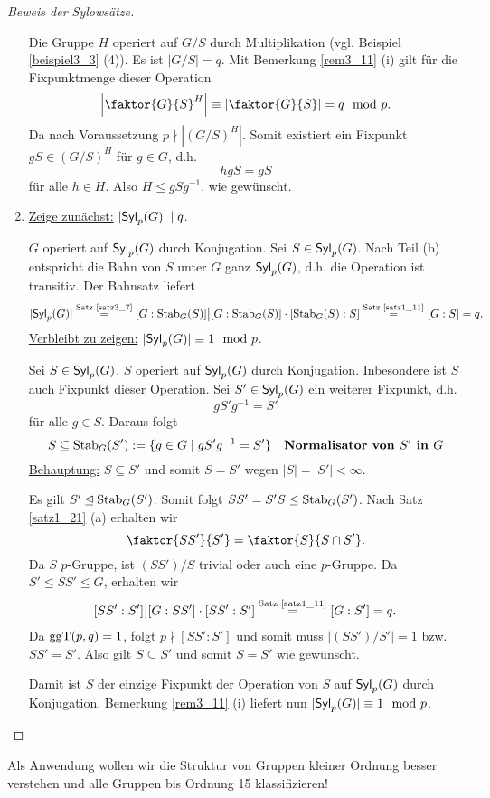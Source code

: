 \begin{proof}[Beweis der Sylowsätze]
\begin{enumerate}[label=(\alph*)]
		Die Gruppe $H$ operiert auf $G/S$ durch Multiplikation (vgl. Beispiel \ref{beispiel3_3} (4)). Es ist $|G/S| = q$. Mit Bemerkung \ref{rem3_11} (i) gilt für die Fixpunktmenge dieser Operation
		\[\left|{\faktor{G}{S}}^H\right| \equiv \left|\faktor{G}{S}\right| = q \mod p.\]
		Da nach Voraussetzung $p \nmid |(G/S)^H|$. Somit existiert ein Fixpunkt $gS \in (G/S)^H$ für $g \in G$, d.h. 
		\[hgS = gS\]
		für alle $h \in H$. Also $H \leq gSg^{-1}$, wie gewünscht.
		
		\item \underline{Zeige zunächst:} $|\mathsf{Syl}_p(G)| \mid q$.
		
		$G$ operiert auf $\mathsf{Syl}_p(G)$ durch Konjugation. Sei $S \in \mathsf{Syl}_p(G)$. Nach Teil (b) entspricht die Bahn von $S$ unter $G$ ganz $\mathsf{Syl}_p(G)$, d.h. die Operation ist transitiv. Der Bahnsatz liefert
		\[|\mathsf{Syl}_p(G)| \overset{\text{Satz \ref{satz3_7}}}{=} [G:\mathrm{Stab}_G(S)] \big| [G:\mathrm{Stab}_G(S)] \cdot [\mathrm{Stab}_G(S) : S] \overset{\text{Satz \ref{satz1_11}}}{=} [G:S] = q.\]
		\underline{Verbleibt zu zeigen:} $|\mathsf{Syl}_p(G)| \equiv 1 \mod p$.

		Sei $S \in \mathsf{Syl}_p(G)$. $S$ operiert auf $\mathsf{Syl}_p(G)$ durch Konjugation. Inbesondere ist $S$ auch Fixpunkt dieser Operation. Sei $S' \in \mathsf{Syl}_p(G)$ ein weiterer Fixpunkt, d.h. 
		\[gS'g^{-1} = S'\]
		für alle $g \in S$. Daraus folgt
		\[S \subseteq \mathrm{Stab}_G(S') := \{g \in G\mid gS'g^{-1} = S'\} \quad \textbf{Normalisator von $S'$ in $G$}\]
		\underline{Behauptung:} $S \subseteq S'$ und somit $S = S'$ wegen $|S| = |S'| < \infty$.
		
		Es gilt $S' \unlhd \mathrm{Stab}_G(S')$. Somit folgt $SS' = S'S \leq \mathrm{Stab}_G(S')$. Nach Satz \ref{satz1_21} (a) erhalten wir 
		\[\faktor{SS'}{S'} = \faktor{S}{S \cap S'}.\]
		Da $S$ $p$-Gruppe, ist $(SS')/S$ trivial oder auch eine $p$-Gruppe. Da $S' \leq SS' \leq G$, erhalten wir
		\[[SS' : S'] \big| [G : SS'] \cdot [SS' : S'] \overset{\text{Satz \ref{satz1_11}}}{=} [G:S'] = q.\]
		Da $\mathrm{ggT}(p,q) = 1$, folgt $p \nmid [SS' : S']$ und somit muss $|(SS')/S'| = 1$ bzw. $SS' = S'$. Also gilt $S \subseteq S'$ und somit $S = S'$ wie gewünscht.
		
		Damit ist $S$ der einzige Fixpunkt der Operation von $S$ auf $\mathsf{Syl}_p(G)$ durch Konjugation. Bemerkung \ref{rem3_11} (i) liefert nun $|\mathsf{Syl}_p(G)| \equiv 1 \mod p$.
	\end{enumerate}
\end{proof}

\begin{leftbar}
	Als Anwendung wollen wir die Struktur von Gruppen kleiner Ordnung besser verstehen und alle Gruppen bis Ordnung 15 klassifizieren!
\end{leftbar}

